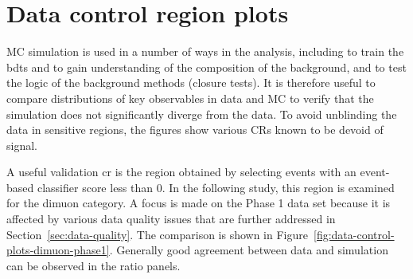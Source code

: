 \clearpage
\section{Data control region plots}
\label{sec:data-control-region-plots}

MC simulation is used in a number of ways in the analysis, including to train the \glspl{bdt} and to gain understanding of the composition of the background, and to test the logic of the background methods (closure tests). It is therefore useful to compare distributions of key observables in data and MC to verify that the simulation does not significantly diverge from the data. To avoid unblinding the data in sensitive regions, the figures show various CRs known to be devoid of signal. 

A useful validation \gls{cr} is the region obtained by selecting events with an event-based classifier score less than 0. In the following study, this region is examined for the dimuon category. A focus is made on the Phase 1 data set because it is affected by various data quality issues that are further addressed in Section~\ref{sec:data-quality}. The comparison is shown in Figure~\ref{fig:data-control-plots-dimuon-phase1}. Generally good agreement between data and simulation can be observed in the ratio panels.


